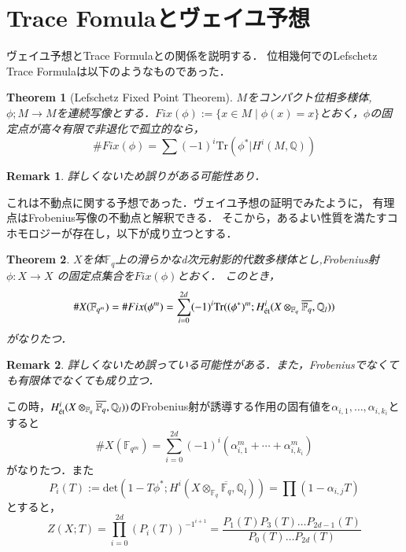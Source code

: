 \documentclass{ujarticle}
\newtheorem{thm}{Theorem}[section]
\newtheorem*{rem}{Remark}
\def\r#1{\text{\rm #1}}
\newcommand{\et}{\r{\'et}}
\begin{document}
\section{Trace Fomulaとヴェイユ予想}
\label{Trace Fomulaとヴェイユ予想}
ヴェイユ予想とTrace Formulaとの関係を説明する．
位相幾何でのLefschetz Trace Formulaは以下のようなものであった．
\begin{thm}[Lefschetz Fixed Point Theorem]
 $M$をコンパクト位相多様体,$\phi;M \to M$を連続写像とする．$Fix(\phi):=\{ x \in M \mid\phi (x)=x\}$とおく，$\phi$の固定点が高々有限で非退化で孤立的なら，
 \begin{equation*}
   \#Fix(\phi) = \sum(-1)^i \mathrm{Tr}(\phi^*| H^i(M,\mathbb{Q}))
 \end{equation*}
\end{thm}
\begin{rem}
 詳しくないため誤りがある可能性あり．
\end{rem}
これは不動点に関する予想であった．ヴェイユ予想の証明でみたように，
有理点はFrobenius写像の不動点と解釈できる．
そこから，あるよい性質を満たすコホモロジーが存在し，以下が成り立つとする．
\begin{thm}
  $X$を体$\mathbb{F}_q$上の滑らかなd次元射影的代数多様体とし,Frobenius射$\phi: X \to X$ の固定点集合を$Fix(\phi)$とおく．
このとき，
\begin{equation*}
  \#X(\mathbb{F}_{q^m})=\#Fix(\phi^m)= \sum_{i=0}^{2d}(-1)^i
  \mathrm{Tr}((\phi^{*})^m;H^i_{\et}(X \otimes_{\mathbb{F}_q} \overline{\mathbb{F}_q}, \mathbb{Q}_l))
\end{equation*}
がなりたつ．
\end{thm}
\begin{rem}
 詳しくないため誤っている可能性がある．また，Frobeniusでなくても有限体でなくても成り立つ．
\end{rem}
この時，$H^i_{\et}(X \otimes_{\mathbb{F}_q} \overline{\mathbb{F}_q}, \mathbb{Q}_l))$のFrobenius射が誘導する作用の固有値を$\alpha_{i,1},\dots,\alpha_{i,k_i}$とすると
\begin{equation*}
　\#X(\mathbb{F}_{q^m})=\sum_{i=0}^{2d}(-1)^i(\alpha_{i,1}^m + \cdots + \alpha_{i,k_i}^m)
\end{equation*}
がなりたつ．また
\begin{equation*}
  P_i(T):=\mathrm{det}(1-T\phi^{*};H^i(X \otimes_{\mathbb{F}_q} \overline{\mathbb{F}_q}, \mathbb{Q}_l))=\prod(1-\alpha_{i,j}T)
\end{equation*}
とすると，
\begin{equation*}
 Z(X;T)=\prod_{i=0}^{2d}(P_i(T))^{{-1}^{i+1}}= \frac{P_1(T)P_3(T)\dots P_{2d-1}(T)}{P_0(T)\dots P_{2d}(T)}
\end{equation*}
\end{document}
